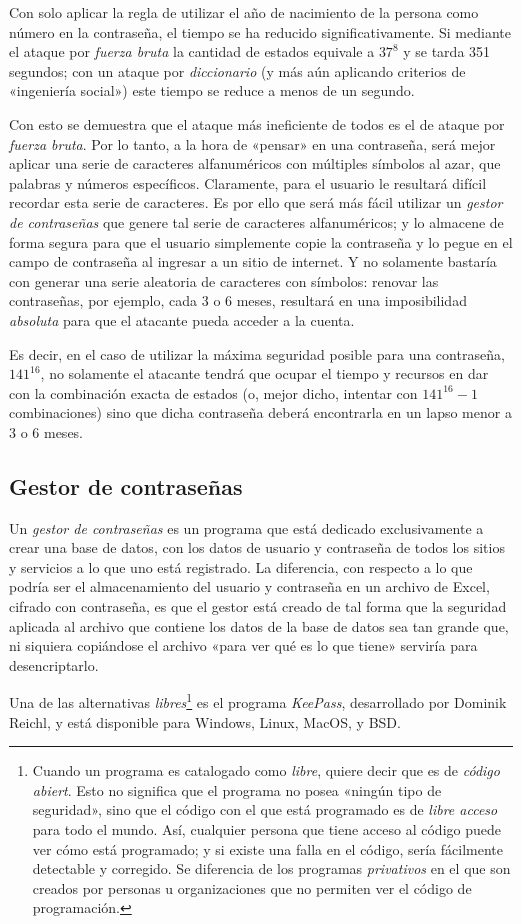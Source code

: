 \documentclass[12pt,a4paper,twoside]{book}
\begin{document}
Con solo aplicar la regla de utilizar el año de nacimiento de la persona como número en la contraseña, el tiempo se ha reducido significativamente. Si mediante el ataque por \textit{fuerza bruta} la cantidad de estados equivale a $ 37^{8} $ y se tarda 351 segundos; con un ataque por \textit{diccionario} (y más aún aplicando criterios de «ingeniería social») este tiempo se reduce a menos de un segundo.

Con esto se demuestra que el ataque más ineficiente de todos es el de ataque por \textit{fuerza bruta}. Por lo tanto, a la hora de «pensar» en una contraseña, será mejor aplicar una serie de caracteres alfanuméricos con múltiples símbolos al azar, que palabras y números específicos. Claramente, para el usuario le resultará difícil recordar esta serie de caracteres. Es por ello que será más fácil utilizar un \textit{gestor de contraseñas} que genere tal serie de caracteres alfanuméricos; y lo almacene de forma segura para que el usuario simplemente copie la contraseña y lo pegue en el campo de contraseña al ingresar a un sitio de internet. Y no solamente bastaría con generar una serie aleatoria de caracteres con símbolos: renovar las contraseñas, por ejemplo, cada 3 o 6 meses, resultará en una imposibilidad \textit{absoluta} para que el atacante pueda acceder a la cuenta.

Es decir, en el caso de utilizar la máxima seguridad posible para una contraseña, $ 141^{16} $, no solamente el atacante tendrá que ocupar el tiempo y recursos en dar con la combinación exacta de estados (o, mejor dicho, intentar con $ 141^{16} - 1 $ combinaciones) sino que dicha contraseña deberá encontrarla en un lapso menor a 3 o 6 meses.

\subsection{Gestor de contraseñas}
Un \textit{gestor de contraseñas} es un programa que está dedicado exclusivamente a crear una base de datos, con los datos de usuario y contraseña de todos los sitios y servicios a lo que uno está registrado. La diferencia, con respecto a lo que podría ser el almacenamiento del usuario y contraseña en un archivo de Excel, cifrado con contraseña, es que el gestor está creado de tal forma que la seguridad aplicada al archivo que contiene los datos de la base de datos sea tan grande que, ni siquiera copiándose el archivo «para ver qué es lo que tiene» serviría para desencriptarlo.

Una de las alternativas \textit{libres}\footnote{Cuando un programa es catalogado como \textit{libre}, quiere decir que es de \textit{código abiert}. Esto no significa que el programa no posea «ningún tipo de seguridad», sino que el código con el que está programado es de \textit{libre acceso} para todo el mundo. Así, cualquier persona que tiene acceso al código puede ver cómo está programado; y si existe una falla en el código, sería fácilmente detectable y corregido. Se diferencia de los programas \textit{privativos} en el que son creados por personas u organizaciones que no permiten ver el código de programación.} es el programa \textit{KeePass}, desarrollado por Dominik Reichl, y está disponible para Windows, Linux, MacOS, y BSD.
\end{document}
